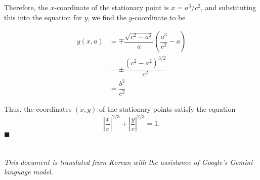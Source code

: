 \documentclass[twocolumn]{article}
\begin{document}
Therefore, the $x$-coordinate of the stationary point is $x = a^3/c^2$, and substituting this into the equation for $y$, we find the $y$-coordinate to be

$$ \begin{aligned}
	y(x, a) &= \mp \dfrac{\sqrt{c^2-a^2}}{a}\left(\dfrac{a^3}{c^2}-a\right)\\
	& = \pm \dfrac{\left( c^2- a^2 \right)^{3/2}}{c^2}\\
	& = \dfrac{b^3}{c^2}
\end{aligned}
$$

Thus, the coordinates $(x, y)$ of the stationary points satisfy the equation
$$\left|\dfrac{x}{c}\right|^{2/3} + \left|\dfrac{y}{c}\right|^{2/3} = 1.$$
$\blacksquare$

\section*{}
\slshape{This document is translated from Korean with the assistance of Google's Gemini language model.}
%
%
\end{document}

